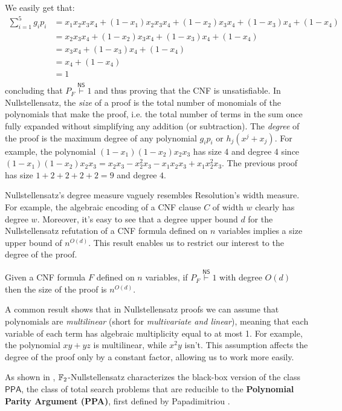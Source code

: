 \noindent
We easily get that:
\[\begin{split}
    \sum_{i = 1}^5 g_ip_{i}&= x_1x_2x_3x_4 + (1-x_1)x_2x_3x_4 + (1-x_2)x_3x_4 + (1-x_3)x_4 + (1-x_4)\\
    &= x_2x_3x_4 + (1-x_2)x_3x_4 + (1-x_3)x_4 + (1-x_4)\\
    &= x_3x_4 + (1-x_3)x_4 + (1-x_4)\\
    &= x_4 + (1-x_4)\\
    &= 1\\
\end{split}\]
concluding that $P_F \stackrel{\mathsf{NS}}{\vdash} 1$ and thus proving that the CNF is unsatisfiable. In Nullstellensatz, the \textit{size} of a proof is the total number of monomials of the polynomials that make the proof, i.e. the total number of terms in the sum once fully expanded without simplifying any addition (or subtraction). The \textit{degree} of the proof is the maximum degree of any polynomial $g_ip_i$ or $h_j(x^j+x_j)$. For example, the polynomial $(1-x_1)(1-x_2)x_2x_3$ has size 4 and degree 4 since $(1-x_1)(1-x_2)x_2x_3 = x_2x_3 - x_2^2x_3 - x_1x_2x_3 + x_1x_2^2x_3$. The previous proof has size $1+2+2+2+2 = 9$ and degree $4$.

Nullstellensatz's degree measure vaguely resembles Resolution's width measure. For example, the algebraic encoding of a CNF clause $C$ of width $w$ clearly has degree $w$. Moreover, it's easy to see that a degree upper bound $d$ for the Nullstellensatz refutation of a CNF formula defined on $n$ variables implies a size upper bound of $n^{O(d)}$. This result enables us to restrict our interest to the degree of the proof.

\begin{proposition}
    \label{degree_size}
 Given a CNF formula $F$ defined on $n$ variables, if $P_F \stackrel{\mathsf{NS}}{\vdash} 1$ with degree $O(d)$ then the size of the proof is $n^{O(d)}$.
\end{proposition}

A common result shows that in Nullstellensatz proofs we can assume that polynomials are \textit{multilinear} (short for \textit{multivariate and linear}), meaning that each variable of each term has algebraic multiplicity equal to at most 1. For example, the polynomial $xy+yz$ is multilinear, while $x^2y$ isn't. This assumption affects the degree of the proof only by a constant factor, allowing us to work more easily.

As shown in , $\mathbb{F}_2$-Nullstellensatz characterizes the black-box version of the class $\mathsf{PPA}$, the class of total search problems that are reducible to the \textbf{Polynomial Parity Argument (PPA)}, first defined by Papadimitriou \cite{PPA_complexity}.

